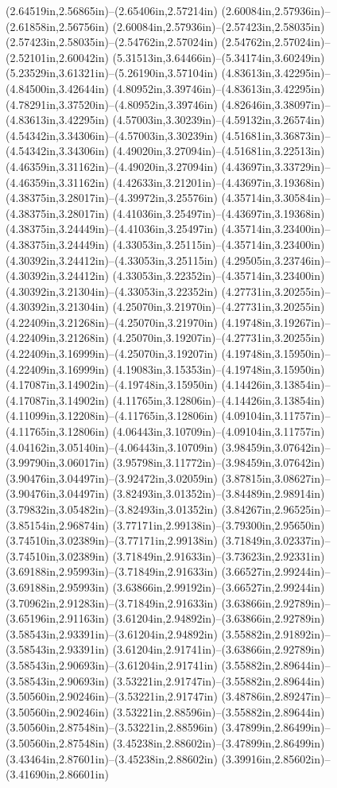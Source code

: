 (2.64519in,2.56865in)--(2.65406in,2.57214in) (2.60084in,2.57936in)--(2.61858in,2.56756in) (2.60084in,2.57936in)--(2.57423in,2.58035in) (2.57423in,2.58035in)--(2.54762in,2.57024in) (2.54762in,2.57024in)--(2.52101in,2.60042in) (5.31513in,3.64466in)--(5.34174in,3.60249in) (5.23529in,3.61321in)--(5.26190in,3.57104in) (4.83613in,3.42295in)--(4.84500in,3.42644in) (4.80952in,3.39746in)--(4.83613in,3.42295in) (4.78291in,3.37520in)--(4.80952in,3.39746in) (4.82646in,3.38097in)--(4.83613in,3.42295in) (4.57003in,3.30239in)--(4.59132in,3.26574in) (4.54342in,3.34306in)--(4.57003in,3.30239in) (4.51681in,3.36873in)--(4.54342in,3.34306in) (4.49020in,3.27094in)--(4.51681in,3.22513in) (4.46359in,3.31162in)--(4.49020in,3.27094in) (4.43697in,3.33729in)--(4.46359in,3.31162in) (4.42633in,3.21201in)--(4.43697in,3.19368in) (4.38375in,3.28017in)--(4.39972in,3.25576in) (4.35714in,3.30584in)--(4.38375in,3.28017in) (4.41036in,3.25497in)--(4.43697in,3.19368in) (4.38375in,3.24449in)--(4.41036in,3.25497in) (4.35714in,3.23400in)--(4.38375in,3.24449in) (4.33053in,3.25115in)--(4.35714in,3.23400in) (4.30392in,3.24412in)--(4.33053in,3.25115in) (4.29505in,3.23746in)--(4.30392in,3.24412in) (4.33053in,3.22352in)--(4.35714in,3.23400in) (4.30392in,3.21304in)--(4.33053in,3.22352in) (4.27731in,3.20255in)--(4.30392in,3.21304in) (4.25070in,3.21970in)--(4.27731in,3.20255in) (4.22409in,3.21268in)--(4.25070in,3.21970in) (4.19748in,3.19267in)--(4.22409in,3.21268in) (4.25070in,3.19207in)--(4.27731in,3.20255in) (4.22409in,3.16999in)--(4.25070in,3.19207in) (4.19748in,3.15950in)--(4.22409in,3.16999in) (4.19083in,3.15353in)--(4.19748in,3.15950in) (4.17087in,3.14902in)--(4.19748in,3.15950in) (4.14426in,3.13854in)--(4.17087in,3.14902in) (4.11765in,3.12806in)--(4.14426in,3.13854in) (4.11099in,3.12208in)--(4.11765in,3.12806in) (4.09104in,3.11757in)--(4.11765in,3.12806in) (4.06443in,3.10709in)--(4.09104in,3.11757in) (4.04162in,3.05140in)--(4.06443in,3.10709in) (3.98459in,3.07642in)--(3.99790in,3.06017in) (3.95798in,3.11772in)--(3.98459in,3.07642in) (3.90476in,3.04497in)--(3.92472in,3.02059in) (3.87815in,3.08627in)--(3.90476in,3.04497in) (3.82493in,3.01352in)--(3.84489in,2.98914in) (3.79832in,3.05482in)--(3.82493in,3.01352in) (3.84267in,2.96525in)--(3.85154in,2.96874in) (3.77171in,2.99138in)--(3.79300in,2.95650in) (3.74510in,3.02389in)--(3.77171in,2.99138in) (3.71849in,3.02337in)--(3.74510in,3.02389in) (3.71849in,2.91633in)--(3.73623in,2.92331in) (3.69188in,2.95993in)--(3.71849in,2.91633in) (3.66527in,2.99244in)--(3.69188in,2.95993in) (3.63866in,2.99192in)--(3.66527in,2.99244in) (3.70962in,2.91283in)--(3.71849in,2.91633in) (3.63866in,2.92789in)--(3.65196in,2.91163in) (3.61204in,2.94892in)--(3.63866in,2.92789in) (3.58543in,2.93391in)--(3.61204in,2.94892in) (3.55882in,2.91892in)--(3.58543in,2.93391in) (3.61204in,2.91741in)--(3.63866in,2.92789in) (3.58543in,2.90693in)--(3.61204in,2.91741in) (3.55882in,2.89644in)--(3.58543in,2.90693in) (3.53221in,2.91747in)--(3.55882in,2.89644in) (3.50560in,2.90246in)--(3.53221in,2.91747in) (3.48786in,2.89247in)--(3.50560in,2.90246in) (3.53221in,2.88596in)--(3.55882in,2.89644in) (3.50560in,2.87548in)--(3.53221in,2.88596in) (3.47899in,2.86499in)--(3.50560in,2.87548in) (3.45238in,2.88602in)--(3.47899in,2.86499in) (3.43464in,2.87601in)--(3.45238in,2.88602in) (3.39916in,2.85602in)--(3.41690in,2.86601in) 